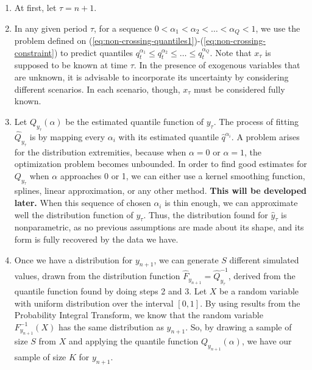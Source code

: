 \begin{enumerate}
	
\item At first, let $\tau = n + 1$.

\item In any given period $\tau$, for a sequence $0 < \alpha_1 < \alpha_2 < \dots < \alpha_Q < 1$, we use the problem defined on  (\ref{eq:non-crossing-quantiles1})-(\ref{eq:non-crossing-constraint}) to predict quantiles 
 $q^{\alpha_1}_{t} \leq q^{\alpha_2}_{t} \leq \dots \leq q^{\alpha_Q}_{t}$.
Note that $x_{\tau}$ is supposed to be known at time $\tau$. In the presence of exogenous variables that are unknown, it is advisable to incorporate its uncertainty by considering different scenarios. In each scenario, though, $x_{\tau}$ must be considered fully known. 
 
\item Let $Q_{y_{\tau}}(\alpha)$ be the estimated quantile function of ${y}_{\tau}$. 
The process of fitting $\hat{Q}_{y_{\tau}}$ is by mapping every $\alpha_i$ with its estimated quantile $\hat{q}^{\alpha_i}$. A problem arises for the distribution extremities, because when $\alpha = 0$ or $\alpha = 1$, the optimization problem becomes unbounded.
In order to find good estimates for $Q_{y_\tau}$ when $\alpha$ approaches 0 or 1, we can either use a kernel smoothing function, splines, linear approximation, or any other method. 
\textbf{This will be developed later.}
When this sequence of chosen $\alpha_i$ is thin enough, we can approximate well the distribution function of $y_{\tau}$.
Thus, the distribution found for $\hat{y}_{\tau}$ is nonparametric, as no previous assumptions are made about its shape, and its form is fully recovered by the data we have.



\item Once we have a distribution for $y_{n+1}$, we can generate $S$ different simulated values, drawn from the distribution function $\hat{F}_{y_{n+1}} = \hat{Q}^{-1}_{y_{\tau}}$, derived from the quantile function found by doing steps 2 and 3. 
Let $X$ be a random variable with uniform distribution over the interval $[0,1]$. By using results from the Probability Integral Transform, we know that the random variable $F^{-1}_{y_{n+1}}(X)$ has the same distribution as $y_{n+1}$. So, by drawing a sample of size $S$ from $X$ and applying the quantile function $Q_{y_{n+1}}(\alpha)$, we have our sample of size $K$ for $y_{n+1}$.


\end{enumerate}
